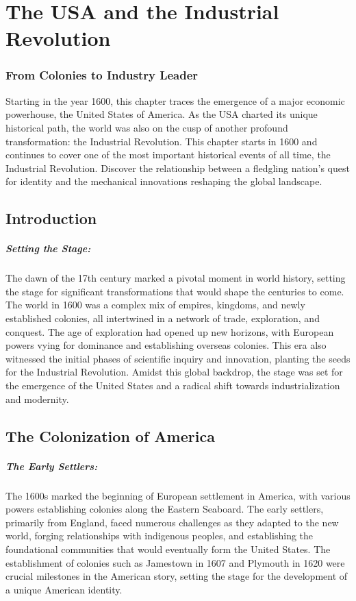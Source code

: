 \documentclass[a4paper,12pt]{book}
\begin{document}
\chapter{The USA and the Industrial Revolution}
\subsection*{From Colonies to Industry Leader}
Starting in the year 1600, this chapter traces the emergence of a major economic powerhouse, the United States of America. As the USA charted its unique historical path, the world was also on the cusp of another profound transformation: the Industrial Revolution. This chapter starts in 1600 and continues to cover one of the most important historical events of all time, the Industrial Revolution. Discover the relationship between a fledgling nation's quest for identity and the mechanical innovations reshaping the global landscape.

\section*{Introduction}

\paragraph{Setting the Stage:}
The dawn of the 17th century marked a pivotal moment in world history, setting the stage for significant transformations that would shape the centuries to come. The world in 1600 was a complex mix of empires, kingdoms, and newly established colonies, all intertwined in a network of trade, exploration, and conquest. The age of exploration had opened up new horizons, with European powers vying for dominance and establishing overseas colonies. This era also witnessed the initial phases of scientific inquiry and innovation, planting the seeds for the Industrial Revolution. Amidst this global backdrop, the stage was set for the emergence of the United States and a radical shift towards industrialization and modernity.

\section*{The Colonization of America}

\paragraph{The Early Settlers:}
The 1600s marked the beginning of European settlement in America, with various powers establishing colonies along the Eastern Seaboard. The early settlers, primarily from England, faced numerous challenges as they adapted to the new world, forging relationships with indigenous peoples, and establishing the foundational communities that would eventually form the United States. The establishment of colonies such as Jamestown in 1607 and Plymouth in 1620 were crucial milestones in the American story, setting the stage for the development of a unique American identity.
\end{document}
